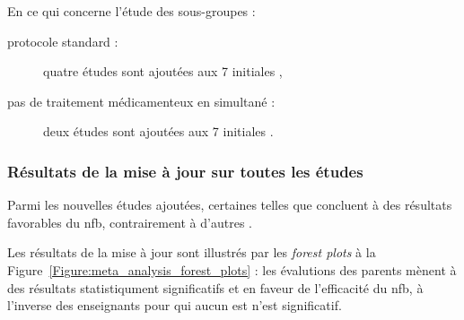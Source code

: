 En ce qui concerne l'étude des sous-groupes :
\begin{description}
\item[protocole standard :] quatre études sont ajoutées \citep{Strehl2017, Baumeister2016, Aggensteiner2019, Minder2018} aux 7 initiales \citep{Bakhshayesh2011,
Christiansen2014, Gevensleben2009, Beauregard2006, Holtmann2009, Heinrich2004, Linden1996},
\item[pas de traitement médicamenteux en simultané :] deux études sont ajoutées \citep{Bazanova2018, Moreno2019} aux 7 initiales \citep{Beauregard2006, 
Gevensleben2009, Bakhshayesh2011, Arnold2014, Linden1996, Christiansen2014, Maurizio2014}.
\end{description}

\subsubsection{Résultats de la mise à jour sur toutes les études}

Parmi les nouvelles études ajoutées, certaines telles que \citet{Shereena2019, Strehl2017} concluent à des résultats favorables du \gls{nfb},
contrairement à d'autres \citep{Moreno2019, Minder2018}.

Les résultats de la mise à jour sont illustrés par les \textit{forest plots} à la Figure~\ref{Figure:meta_analysis_forest_plots} : les évalutions
des parents mènent à des résultats statistiqument significatifs et en faveur de l'efficacité du \gls{nfb}, à l'inverse des enseignants pour qui
aucun \gls{est} n'est significatif.

